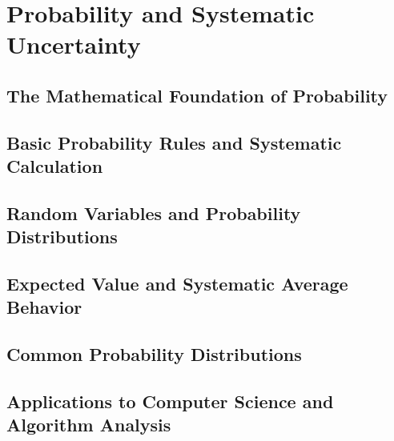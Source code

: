 
\chapter{Probability and Systematic Uncertainty}

\section{The Mathematical Foundation of Probability}

\section{Basic Probability Rules and Systematic Calculation}

\section{Random Variables and Probability Distributions}

\section{Expected Value and Systematic Average Behavior}

\section{Common Probability Distributions}

\section{Applications to Computer Science and Algorithm Analysis}
